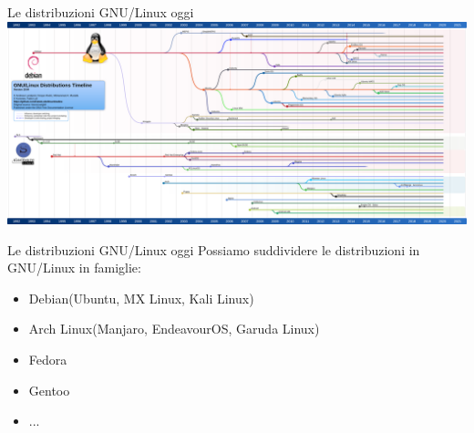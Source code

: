 \begin{frame}{Le distribuzioni GNU/Linux oggi}
    \centering
    \includegraphics[scale=0.18]{images/aygzaivcbmd51.png}
\end{frame}

\begin{frame}{Le distribuzioni GNU/Linux oggi}
Possiamo suddividere le distribuzioni in GNU/Linux in famiglie:
\begin{itemize}
    \item Debian(Ubuntu, MX Linux, Kali Linux)
    \item Arch Linux(Manjaro, EndeavourOS, Garuda Linux)
    \item Fedora
    \item Gentoo
    \item ...
\end{itemize}

\end{frame}

